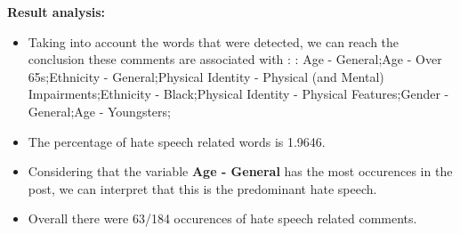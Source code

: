 \documentclass[11pt]{article}
\begin{document}
\textbf{\Large Result analysis:}

\begin{itemize}\item Taking into account the words that were detected, we can reach the conclusion these comments are associated with : : Age - General;Age - Over 65s;Ethnicity - General;Physical Identity - Physical (and Mental) Impairments;Ethnicity - Black;Physical Identity - Physical Features;Gender - General;Age - Youngsters;%

\item The percentage of hate speech related words is 1.9646.

\item Considering that the variable \textbf{Age - General} has the most occurences in the post, we can interpret that this is the predominant hate speech.

\item Overall there were 63/184 occurences of hate speech related comments.\end{itemize}
\end{document}
